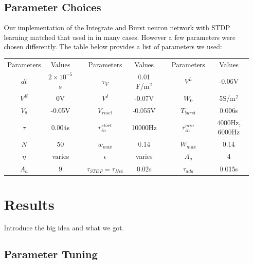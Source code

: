 \documentclass[12pt, final]{article}
\begin{document}
\subsection{Parameter Choices}

Our implementation of the Integrate and Burst neuron network with STDP learning matched that used in \cite{Fiete} in many cases. However a few parameters were chosen differently. The table below provides a list of parameters we used:

\begin{center}
\begin{tabular}{|c|c|p{0.5cm}|c|c|p{0.5 cm}|c|c|}
\cline{1-2}\cline{4-5}\cline{7-8}
Parameters & Values & & Parameters & Values& & Parameters& Values\\

\cline{1-2}\cline{4-5}\cline{7-8}
\(dt\) & \(2 \times 10^{-5}\)s& & \(\tau_V\) & 0.01 F/m\(^2\)& &\(V^L\) & -0.06V\\

\cline{1-2}\cline{4-5}\cline{7-8}
\(V^E\) & 0V& & \(V^I\) & -0.07V& & \(W_0\) & 5S/m\(^2\)\\

\cline{1-2}\cline{4-5}\cline{7-8}
\(V_{\theta}\) & -0.05V & & \(V_{reset}\) & -0.055V & & \(T_{burst}\) & 0.006s\\

\cline{1-2}\cline{4-5}\cline{7-8}
\(\tau\) & 0.004s & & \(r_{in}^{start}\) & 10000Hz & & \(r_{in}^{min}\) & 4000Hz, 6000Hz\\

\cline{1-2}\cline{4-5}\cline{7-8}
\(N\) & 50 & & \(w_{max}\) & 0.14 & & \(W_{max}\) & 0.14\\

\cline{1-2}\cline{4-5}\cline{7-8}
\(\eta\) & varies & & \(\epsilon\) & varies & & \(A_g\) & 4\\

\cline{1-2}\cline{4-5}\cline{7-8}
\(A_a\) & 9 & & \(\tau_{STDP}= \tau_{Heb}\) & 0.02s & & \(\tau_{ada}\) & 0.015s\\
\end{tabular}
\end{center}

\section{Results}

Introduce the big idea and what we got.

\subsection{Parameter Tuning}
\end{document}
